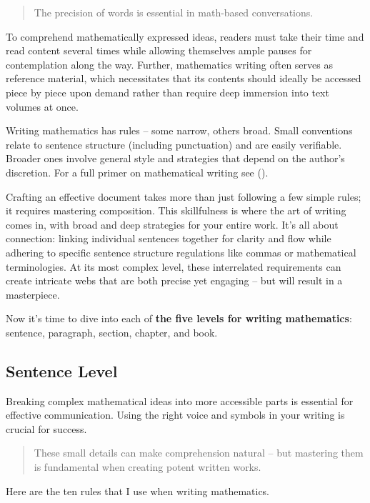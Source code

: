 \documentclass[
  twoside,
  12pt,
  letterpaper,
  fleqn]{article}
\begin{document}
\begin{quote}
The precision of words is essential in math-based conversations.
\end{quote}

To comprehend mathematically expressed ideas, readers must take their
time and read content several times while allowing themselves ample
pauses for contemplation along the way. Further, mathematics writing
often serves as reference material, which necessitates that its contents
should ideally be accessed piece by piece upon demand rather than
require deep immersion into text volumes at once.

Writing mathematics has rules -- some narrow, others broad. Small
conventions relate to sentence structure (including punctuation) and are
easily verifiable. Broader ones involve general style and strategies
that depend on the author's discretion. For a full primer on
mathematical writing see (\textcite{krantz2017primer}).

Crafting an effective document takes more than just following a few
simple rules; it requires mastering composition. This skillfulness is
where the art of writing comes in, with broad and deep strategies for
your entire work. It's all about connection: linking individual
sentences together for clarity and flow while adhering to specific
sentence structure regulations like commas or mathematical
terminologies. At its most complex level, these interrelated
requirements can create intricate webs that are both precise yet
engaging -- but will result in a masterpiece.

Now it's time to dive into each of \textbf{the five levels for writing
mathematics}: sentence, paragraph, section, chapter, and book.

\hypertarget{sentence-level}{%
\subsection{Sentence Level}\label{sentence-level}}

Breaking complex mathematical ideas into more accessible parts is
essential for effective communication. Using the right voice and symbols
in your writing is crucial for success.

\begin{quote}
These small details can make comprehension natural -- but mastering them
is fundamental when creating potent written works.
\end{quote}

Here are the ten rules that I use when writing mathematics.
\end{document}
